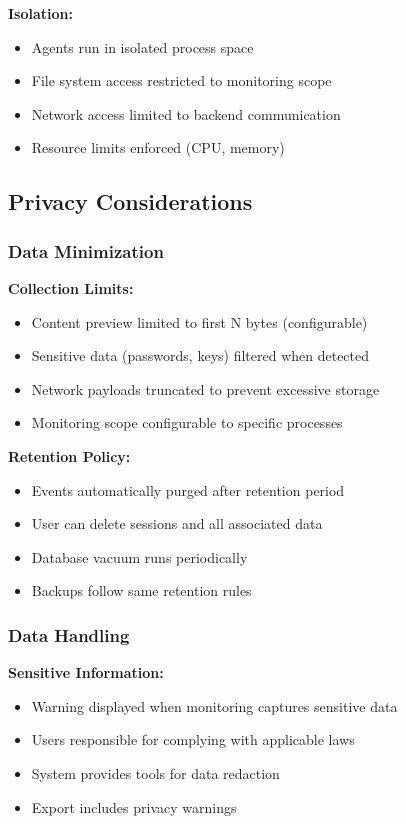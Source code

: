 \textbf{Isolation:}
\begin{itemize}
    \item Agents run in isolated process space
    \item File system access restricted to monitoring scope
    \item Network access limited to backend communication
    \item Resource limits enforced (CPU, memory)
\end{itemize}

\subsection{Privacy Considerations}

\subsubsection{Data Minimization}

\textbf{Collection Limits:}
\begin{itemize}
    \item Content preview limited to first N bytes (configurable)
    \item Sensitive data (passwords, keys) filtered when detected
    \item Network payloads truncated to prevent excessive storage
    \item Monitoring scope configurable to specific processes
\end{itemize}

\textbf{Retention Policy:}
\begin{itemize}
    \item Events automatically purged after retention period
    \item User can delete sessions and all associated data
    \item Database vacuum runs periodically
    \item Backups follow same retention rules
\end{itemize}

\subsubsection{Data Handling}

\textbf{Sensitive Information:}
\begin{itemize}
    \item Warning displayed when monitoring captures sensitive data
    \item Users responsible for complying with applicable laws
    \item System provides tools for data redaction
    \item Export includes privacy warnings
\end{itemize}

